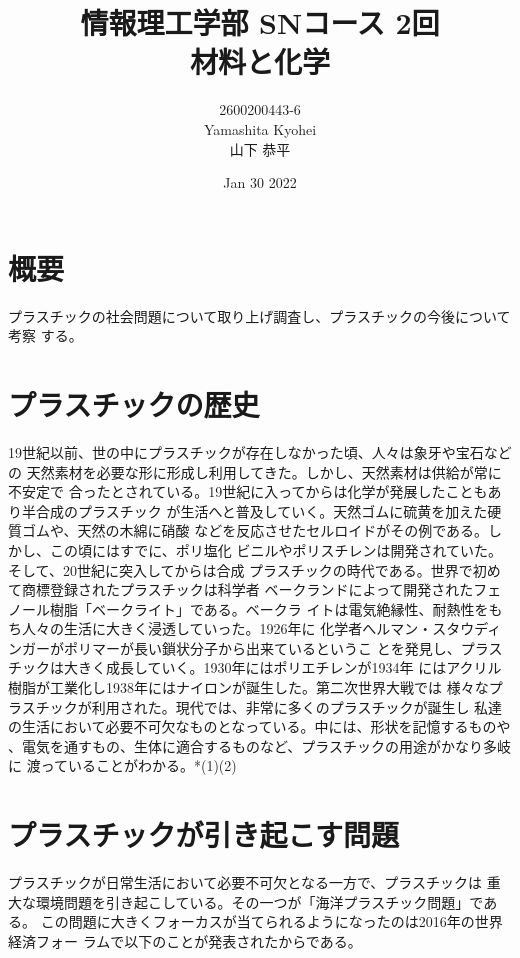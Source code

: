 \documentclass[dvipdfmx,autodetect-engine,titlepage]{jsarticle}
\title{情報理工学部 SNコース 2回\\
材料と化学\\
}
\author{2600200443-6\\Yamashita Kyohei\\山下 恭平}
\date{Jan 30 2022}
\begin{document}
\maketitle

\section{概要}
プラスチックの社会問題について取り上げ調査し、プラスチックの今後について考察
する。

\section{プラスチックの歴史}
19世紀以前、世の中にプラスチックが存在しなかった頃、人々は象牙や宝石などの
天然素材を必要な形に形成し利用してきた。しかし、天然素材は供給が常に不安定で
合ったとされている。19世紀に入ってからは化学が発展したこともあり半合成のプラスチック
が生活へと普及していく。天然ゴムに硫黄を加えた硬質ゴムや、天然の木綿に硝酸
などを反応させたセルロイドがその例である。しかし、この頃にはすでに、ポリ塩化
ビニルやポリスチレンは開発されていた。そして、20世紀に突入してからは合成
プラスチックの時代である。世界で初めて商標登録されたプラスチックは科学者
ベークランドによって開発されたフェノール樹脂「ベークライト」である。ベークラ
イトは電気絶縁性、耐熱性をもち人々の生活に大きく浸透していった。1926年に
化学者へルマン・スタウディンガーがポリマーが長い鎖状分子から出来ているというこ
とを発見し、プラスチックは大きく成長していく。1930年にはポリエチレンが1934年
にはアクリル樹脂が工業化し1938年にはナイロンが誕生した。第二次世界大戦では
様々なプラスチックが利用された。現代では、非常に多くのプラスチックが誕生し
私達の生活において必要不可欠なものとなっている。中には、形状を記憶するものや
、電気を通すもの、生体に適合するものなど、プラスチックの用途がかなり多岐に
渡っていることがわかる。*(1)(2)

\section{プラスチックが引き起こす問題}
プラスチックが日常生活において必要不可欠となる一方で、プラスチックは
重大な環境問題を引き起こしている。その一つが「海洋プラスチック問題」である。
この問題に大きくフォーカスが当てられるようになったのは2016年の世界経済フォー
ラムで以下のことが発表されたからである。
\end{document}
